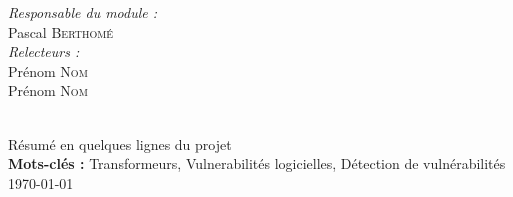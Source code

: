 \begin{titlepage}
\begin{center}
\begin{minipage}{0.4\textwidth}
\begin{flushleft}
            \end{flushleft}
        \end{minipage}
        \begin{minipage}{0.4\textwidth}
            \begin{flushright} \large
                \emph{Responsable du module :} \\
                Pascal \textsc{Berthomé}\\
                \emph{Relecteurs :} \\
                Prénom \textsc{Nom}\\
                Prénom \textsc{Nom}\\
            \end{flushright}
        \end{minipage}
        \vfill
        \\[3mm]
        Résumé en quelques lignes du projet\\
        \textbf{Mots-clés :} Transformeurs, Vulnerabilités logicielles, Détection de
    vulnérabilités\\
        \vfill
        {\large \today}
    \end{center}
\end{titlepage}